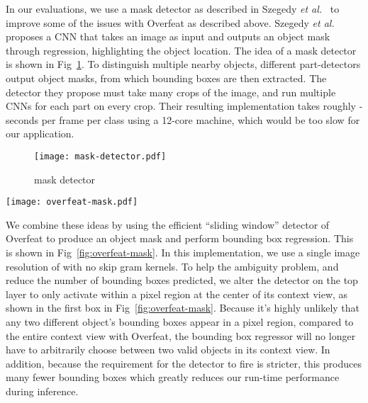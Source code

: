 \documentclass[journal]{IEEEtran}
\begin{document}
In our evaluations, we use a mask detector as described in Szegedy \textit{et al.}~\cite{szegedy-2013} to improve some of the issues with Overfeat as described above. Szegedy \textit{et al.} proposes a CNN that takes an image as input and outputs an object mask through regression, highlighting the object location. The idea of a mask detector is shown in Fig~\ref{fig:mask-detector}. To distinguish multiple nearby objects, different part-detectors output object masks, from which bounding boxes are then extracted. The detector they propose must take many crops of the image, and run multiple CNNs for each part on every crop. Their resulting implementation takes roughly - seconds per frame per class using a 12-core machine, which would be too slow for our application. 

\begin{figure}[tb]
  \centering
    \texttt{[image: mask-detector.pdf]}
 \caption{mask detector}
 \label{fig:mask-detector}
\end{figure}


\begin{figure*}[tb]
  \centering
    \texttt{[image: overfeat-mask.pdf]}
 \caption{overfeat-mask}
 \label{fig:overfeat-mask}
\end{figure*}

We combine these ideas by using the efficient ``sliding window'' detector of Overfeat to produce an object mask and perform bounding box regression. This is shown in Fig~\ref{fig:overfeat-mask}. In this implementation, we use a single image resolution of  with no skip gram kernels. To help the ambiguity problem, and reduce the number of bounding boxes predicted, we alter the detector on the top layer to only activate within a  pixel region at the center of its context view, as shown in the first box in Fig~\ref{fig:overfeat-mask}. Because it's highly unlikely that any two different object's bounding boxes appear in a  pixel region, compared to the entire context view with Overfeat, the bounding box regressor will no longer have to arbitrarily choose between two valid objects in its context view. In addition, because the requirement for the detector to fire is stricter, this produces many fewer bounding boxes which greatly reduces our run-time performance during inference. 
\end{document}
